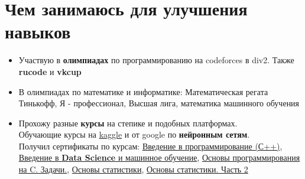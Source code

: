 \documentclass[a4paper,10pt]{report}
\begin{document}
\section{Чем занимаюсь для улучшения навыков}
\begin{itemize}
    \item Участвую в \textbf{олимпиадах} по программированию на codeforces в div2. Также \textbf{rucode} и \textbf{vkcup}
    \item В олимпиадах по математике и информатике: Математическая регата Тинькофф, Я - профессионал, Высшая лига, математика машинного обучения

    \item Прохожу разные \textbf{курсы} на степике и подобных платформах.
    \\ Обучающие курсы на \underline{kaggle} и от google по \textbf{нейронным сетям}.
    \\Получил сертификаты по курсам:        \href{https://stepik.org/course/363/syllabus}{Введение в программирование (С++)}, \href{https://stepik.org/course/4852/syllabus}{Введение в \textbf{Data Science} и машинное обучение},          \href{https://stepik.org/course/3078/syllabus}{Основы программирования на C. Задачи.}, \href{https://stepik.org/course/76/syllabus}{Основы статистики}, \href{https://stepik.org/course/524/syllabus}{Основы статистики. Часть 2}    
\end{itemize}
\end{document}
